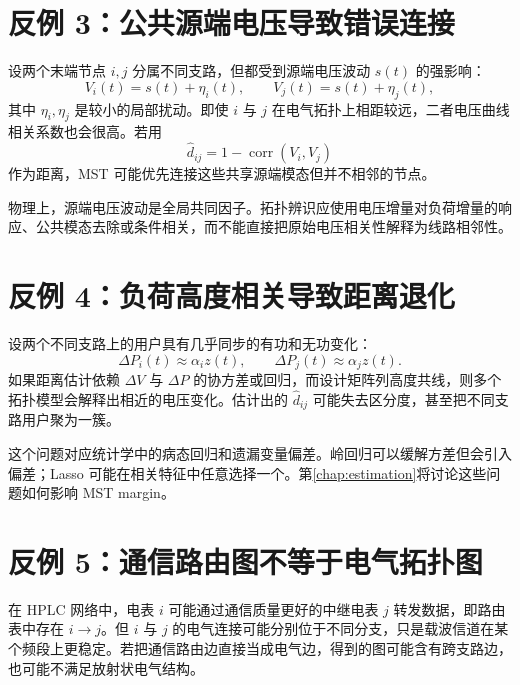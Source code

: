 \section{反例 3：公共源端电压导致错误连接}

\begin{counterexample}[公共模态污染相关性]
\label{cex:source_voltage}
设两个末端节点 $i,j$ 分属不同支路，但都受到源端电压波动 $s(t)$ 的强影响：
\begin{equation}
  V_i(t)=s(t)+\eta_i(t),\qquad
  V_j(t)=s(t)+\eta_j(t),
\end{equation}
其中 $\eta_i,\eta_j$ 是较小的局部扰动。即使 $i$ 与 $j$ 在电气拓扑上相距较远，二者电压曲线相关系数也会很高。若用
\begin{equation}
  \widehat d_{ij}=1-\operatorname{corr}(V_i,V_j)
\end{equation}
作为距离，MST 可能优先连接这些共享源端模态但并不相邻的节点。
\end{counterexample}

物理上，源端电压波动是全局共同因子。拓扑辨识应使用电压增量对负荷增量的响应、公共模态去除或条件相关，而不能直接把原始电压相关性解释为线路相邻性。

\section{反例 4：负荷高度相关导致距离退化}

\begin{counterexample}[同步负荷曲线]
\label{cex:correlated_load}
设两个不同支路上的用户具有几乎同步的有功和无功变化：
\begin{equation}
  \Delta P_i(t)\approx \alpha_i z(t),\qquad
  \Delta P_j(t)\approx \alpha_j z(t).
\end{equation}
如果距离估计依赖 $\Delta V$ 与 $\Delta P$ 的协方差或回归，而设计矩阵列高度共线，则多个拓扑模型会解释出相近的电压变化。估计出的 $\widehat d_{ij}$ 可能失去区分度，甚至把不同支路用户聚为一簇。
\end{counterexample}

这个问题对应统计学中的病态回归和遗漏变量偏差。岭回归可以缓解方差但会引入偏差；Lasso 可能在相关特征中任意选择一个。第\cref{chap:estimation}将讨论这些问题如何影响 MST margin。

\section{反例 5：通信路由图不等于电气拓扑图}

\begin{counterexample}
\label{cex:communication_not_electrical}
在 HPLC 网络中，电表 $i$ 可能通过通信质量更好的中继电表 $j$ 转发数据，即路由表中存在 $i\to j$。但 $i$ 与 $j$ 的电气连接可能分别位于不同分支，只是载波信道在某个频段上更稳定。若把通信路由边直接当成电气边，得到的图可能含有跨支路边，也可能不满足放射状电气结构。
\end{counterexample}

